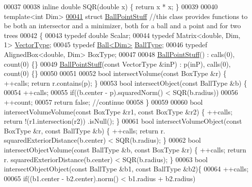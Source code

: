 \begin{DoxyCode}
00037 
00038 \textcolor{keyword}{inline} \textcolor{keywordtype}{double} SQR(\textcolor{keywordtype}{double} x) \{ \textcolor{keywordflow}{return} x * x; \}
00039 
00040 \textcolor{keyword}{template}<\textcolor{keywordtype}{int} Dim>
\hyperlink{struct_ball_point_stuff}{00041} \textcolor{keyword}{struct }\hyperlink{struct_ball_point_stuff}{BallPointStuff} \textcolor{comment}{//this class provides functions to be both an intersector and a
       minimizer, both for a ball and a point and for two trees}
00042 \{
00043   \textcolor{keyword}{typedef} \textcolor{keywordtype}{double} Scalar;
00044   \textcolor{keyword}{typedef} Matrix<double, Dim, 1> \hyperlink{struct_vector_type}{VectorType};
00045   \textcolor{keyword}{typedef} \hyperlink{struct_ball}{Ball<Dim>} \hyperlink{struct_ball}{BallType};
00046   \textcolor{keyword}{typedef} AlignedBox<double, Dim> BoxType;
00047 
00048   \hyperlink{struct_ball_point_stuff}{BallPointStuff}() : calls(0), count(0) \{\}
00049   \hyperlink{struct_ball_point_stuff}{BallPointStuff}(\textcolor{keyword}{const} VectorType &inP) : p(inP), calls(0), count(0) \{\}
00050 
00051 
00052   \textcolor{keywordtype}{bool} intersectVolume(\textcolor{keyword}{const} BoxType &r) \{ ++calls; \textcolor{keywordflow}{return} r.contains(p); \}
00053   \textcolor{keywordtype}{bool} intersectObject(\textcolor{keyword}{const} BallType &b) \{
00054     ++calls;
00055     \textcolor{keywordflow}{if}((b.center - p).squaredNorm() < SQR(b.radius))
00056       ++count;
00057     \textcolor{keywordflow}{return} \textcolor{keyword}{false}; \textcolor{comment}{//continue}
00058   \}
00059 
00060   \textcolor{keywordtype}{bool} intersectVolumeVolume(\textcolor{keyword}{const} BoxType &r1, \textcolor{keyword}{const} BoxType &r2) \{ ++calls; \textcolor{keywordflow}{return} !(r1.intersection(r2))
      .isNull(); \}
00061   \textcolor{keywordtype}{bool} intersectVolumeObject(\textcolor{keyword}{const} BoxType &r, \textcolor{keyword}{const} BallType &b) \{ ++calls; \textcolor{keywordflow}{return} r.
      squaredExteriorDistance(b.center) < SQR(b.radius); \}
00062   \textcolor{keywordtype}{bool} intersectObjectVolume(\textcolor{keyword}{const} BallType &b, \textcolor{keyword}{const} BoxType &r) \{ ++calls; \textcolor{keywordflow}{return} r.
      squaredExteriorDistance(b.center) < SQR(b.radius); \}
00063   \textcolor{keywordtype}{bool} intersectObjectObject(\textcolor{keyword}{const} BallType &b1, \textcolor{keyword}{const} BallType &b2)\{
00064     ++calls;
00065     \textcolor{keywordflow}{if}((b1.center - b2.center).norm() < b1.radius + b2.radius)

\end{DoxyCode}
